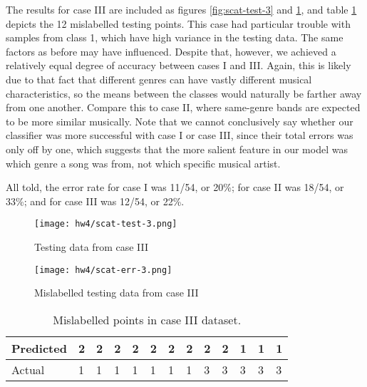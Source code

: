 \documentclass[a4paper,10 pt]{article}
\begin{document}
The results for case III are included as figures \ref{fig:scat-test-3} and \ref{fig:scat-err-3}, and table \ref{tab:err-3} depicts the 12 mislabelled testing points. This case had particular trouble with samples from class 1, which have high variance in the testing data. The same factors as before may have influenced. Despite that, however, we achieved a relatively equal degree of accuracy between cases I and III. Again, this is likely due to that fact that different genres can have vastly different musical characteristics, so the means between the classes would naturally be farther away from one another. Compare this to case II, where same-genre bands are expected to be more similar musically. Note that we cannot conclusively say whether our classifier was more successful with case I or case III, since their total errors was only off by one, which suggests that the more salient feature in our model was which genre a song was from, not which specific musical artist.

All told, the error rate for case I was 11/54, or 20\%; for case II was 18/54, or 33\%; and for case III was 12/54, or 22\%.

\begin{figure}
    \centering
    \begin{minipage}{0.45\textwidth}
        \centering
        \texttt{[image: hw4/scat-test-3.png]} %
        \caption{Testing data from case III}
        \label{fig:scat-test-3}
    \end{minipage}\hfill
    \begin{minipage}{0.45\textwidth}
        \centering
        \texttt{[image: hw4/scat-err-3.png]} %
        \caption{Mislabelled testing data from case III}
        \label{fig:scat-err-3}
    \end{minipage}
\end{figure}

\begin{table}[]
\centering
\begin{tabular}{|l|l|l|l|l|l|l|l|l|l|l|l|l|}
\hline
Predicted & 2 & 2 & 2 & 2 & 2 & 2 & 2 & 2 & 2 & 1 & 1 & 1 \\ \hline
Actual & 1 & 1 & 1 & 1 & 1 & 1 & 1 & 3 & 3 & 3 & 3 & 3 \\ \hline
\end{tabular}
\caption{Mislabelled points in case III dataset.}
\label{tab:err-3}
\end{table}
\end{document}
